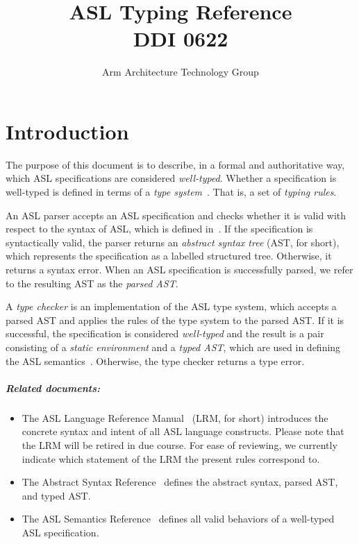 \documentclass{book}
\author{Arm Architecture Technology Group}
\title{ASL Typing Reference \\
       DDI 0622}
\begin{document}
\maketitle

\tableofcontents{}





\chapter{Introduction}

The purpose of this document is to describe, in a formal and authoritative way,
which ASL specifications are considered \emph{well-typed}.
Whether a specification is well-typed is defined in terms of a \emph{type system}~\cite{TypeSystemsLucaCardelli}.
That is, a set of \emph{typing rules}.

An ASL parser accepts an ASL specification and checks whether it is valid with respect to the syntax of ASL,
which is defined in~\cite{ASLAbstractSyntaxReference}.
If the specification is syntactically valid, the parser returns an \emph{abstract syntax tree} (AST, for short),
which represents the specification as a labelled structured tree. Otherwise, it returns a syntax error.
When an ASL specification is successfully parsed, we refer to the resulting AST as the \emph{parsed AST}.

A \emph{type checker} is an implementation of the ASL type system, which accepts a parsed AST and applies the
rules of the type system to the parsed AST. If it is successful, the specification
is considered \emph{well-typed} and the result is a pair consisting of
a \emph{static environment} and a \emph{typed AST}, which are used in defining the ASL semantics~\cite{ASLSemanticsReference}.
Otherwise, the type checker returns a type error.

\paragraph{Related documents:}
\begin{itemize}
  \item The ASL Language Reference Manual~\cite{LRM} (LRM, for short) introduces the concrete syntax and intent
  of all ASL language constructs.
  Please note that the LRM will be retired in due course. For ease of reviewing, we currently indicate which statement
  of the LRM the present rules correspond to.
  \item The Abstract Syntax Reference~\cite{ASLAbstractSyntaxReference} defines the abstract syntax, parsed AST, and typed AST.
  \item The ASL Semantics Reference~\cite{ASLSemanticsReference} defines all valid behaviors of a well-typed ASL specification.
\end{itemize}
\end{document}
